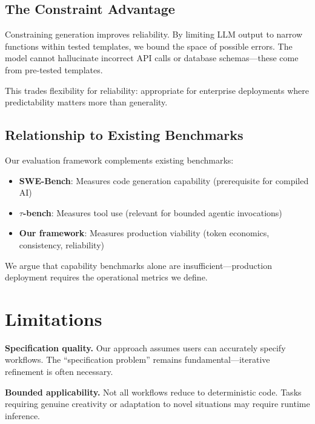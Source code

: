 \documentclass[11pt]{article}
\begin{document}
\subsection{The Constraint Advantage}

Constraining generation improves reliability. By limiting LLM output to narrow functions within tested templates, we bound the space of possible errors. The model cannot hallucinate incorrect API calls or database schemas—these come from pre-tested templates.

This trades flexibility for reliability: appropriate for enterprise deployments where predictability matters more than generality.

\subsection{Relationship to Existing Benchmarks}

Our evaluation framework complements existing benchmarks:
\begin{itemize}
    \item \textbf{SWE-Bench}: Measures code generation capability (prerequisite for compiled AI)
    \item \textbf{$\tau$-bench}: Measures tool use (relevant for bounded agentic invocations)
    \item \textbf{Our framework}: Measures production viability (token economics, consistency, reliability)
\end{itemize}

We argue that capability benchmarks alone are insufficient—production deployment requires the operational metrics we define.

\section{Limitations}
\label{sec:limitations}

\textbf{Specification quality.} Our approach assumes users can accurately specify workflows. The ``specification problem'' remains fundamental—iterative refinement is often necessary.

\textbf{Bounded applicability.} Not all workflows reduce to deterministic code. Tasks requiring genuine creativity or adaptation to novel situations may require runtime inference.
\end{document}
